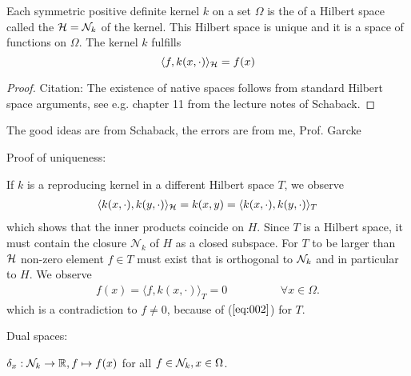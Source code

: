 \begin{theorem}\label{thm:1.9}
    Each symmetric positive definite kernel $k$ on a set $\Omega$ is the  of 
    a Hilbert space called the  $\mathcal{H}=\mathcal{N}_k$ of the kernel.
    This Hilbert space is unique and it is a space of functions on $\Omega$. The kernel $k$ fulfills
    \begin{equation}\label{eq:002}
        \langle f,k(x,\cdot)\rangle_{\mathcal{H}}=f(x)
    \end{equation}
\end{theorem}

\begin{proof}
    Citation: The existence of native spaces follows from standard Hilbert space arguments, see e.g. chapter 11 from the lecture notes of Schaback. 
\end{proof}

\begin{aremark}
    The good ideas are from Schaback, the errors are from me, Prof. Garcke
\end{aremark}

Proof of uniqueness:

If $k$ is a reproducing kernel in a different Hilbert space $T$, we observe
\begin{align*}
    \langle k(x,\cdot),k(y,\cdot)\rangle_{\mathcal{H}}=k(x,y)=\langle k(x,\cdot),k(y,\cdot)\rangle_T
\end{align*}
which shows that the inner products coincide on $H$.
Since $T$ is a Hilbert space, it must contain the closure $\mathcal{N}_k$ of $H$ as a closed subspace. 
For $T$ to be larger than $\mathcal{H}$ non-zero element $f\in T$ must exist that is orthogonal to $\mathcal{N}_k$ and in particular 
to $H$. We observe 
\begin{align*}
    f(x)=\langle f,k(x,\cdot) \rangle_T=0\hspace{2cm}\forall x\in\Omega.
\end{align*}
which is a contradiction to $f\neq 0$, because of ($\ref{eq:002}$) for $T$.

Dual spaces:

$\delta_x:\mathcal{N}_k\to\mathbb{R},f\mapsto f(x)$ for all $f\in\mathcal{N}_k,x\in\Omega$.

